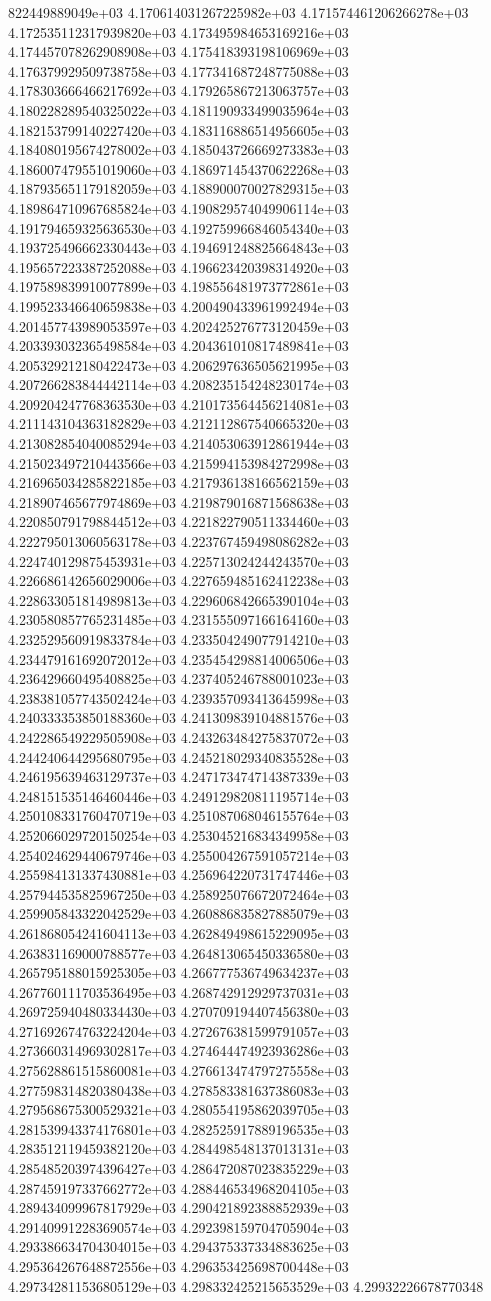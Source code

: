 822449889049e+03	4.170614031267225982e+03	4.171574461206266278e+03	4.172535112317939820e+03	4.173495984653169216e+03	4.174457078262908908e+03	4.175418393198106969e+03	4.176379929509738758e+03	4.177341687248775088e+03	4.178303666466217692e+03	4.179265867213063757e+03	4.180228289540325022e+03	4.181190933499035964e+03	4.182153799140227420e+03	4.183116886514956605e+03	4.184080195674278002e+03	4.185043726669273383e+03	4.186007479551019060e+03	4.186971454370622268e+03	4.187935651179182059e+03	4.188900070027829315e+03	4.189864710967685824e+03	4.190829574049906114e+03	4.191794659325636530e+03	4.192759966846054340e+03	4.193725496662330443e+03	4.194691248825664843e+03	4.195657223387252088e+03	4.196623420398314920e+03	4.197589839910077899e+03	4.198556481973772861e+03	4.199523346640659838e+03	4.200490433961992494e+03	4.201457743989053597e+03	4.202425276773120459e+03	4.203393032365498584e+03	4.204361010817489841e+03	4.205329212180422473e+03	4.206297636505621995e+03	4.207266283844442114e+03	4.208235154248230174e+03	4.209204247768363530e+03	4.210173564456214081e+03	4.211143104363182829e+03	4.212112867540665320e+03	4.213082854040085294e+03	4.214053063912861944e+03	4.215023497210443566e+03	4.215994153984272998e+03	4.216965034285822185e+03	4.217936138166562159e+03	4.218907465677974869e+03	4.219879016871568638e+03	4.220850791798844512e+03	4.221822790511334460e+03	4.222795013060563178e+03	4.223767459498086282e+03	4.224740129875453931e+03	4.225713024244243570e+03	4.226686142656029006e+03	4.227659485162412238e+03	4.228633051814989813e+03	4.229606842665390104e+03	4.230580857765231485e+03	4.231555097166164160e+03	4.232529560919833784e+03	4.233504249077914210e+03	4.234479161692072012e+03	4.235454298814006506e+03	4.236429660495408825e+03	4.237405246788001023e+03	4.238381057743502424e+03	4.239357093413645998e+03	4.240333353850188360e+03	4.241309839104881576e+03	4.242286549229505908e+03	4.243263484275837072e+03	4.244240644295680795e+03	4.245218029340835528e+03	4.246195639463129737e+03	4.247173474714387339e+03	4.248151535146460446e+03	4.249129820811195714e+03	4.250108331760470719e+03	4.251087068046155764e+03	4.252066029720150254e+03	4.253045216834349958e+03	4.254024629440679746e+03	4.255004267591057214e+03	4.255984131337430881e+03	4.256964220731747446e+03	4.257944535825967250e+03	4.258925076672072464e+03	4.259905843322042529e+03	4.260886835827885079e+03	4.261868054241604113e+03	4.262849498615229095e+03	4.263831169000788577e+03	4.264813065450336580e+03	4.265795188015925305e+03	4.266777536749634237e+03	4.267760111703536495e+03	4.268742912929737031e+03	4.269725940480334430e+03	4.270709194407456380e+03	4.271692674763224204e+03	4.272676381599791057e+03	4.273660314969302817e+03	4.274644474923936286e+03	4.275628861515860081e+03	4.276613474797275558e+03	4.277598314820380438e+03	4.278583381637386083e+03	4.279568675300529321e+03	4.280554195862039705e+03	4.281539943374176801e+03	4.282525917889196535e+03	4.283512119459382120e+03	4.284498548137013131e+03	4.285485203974396427e+03	4.286472087023835229e+03	4.287459197337662772e+03	4.288446534968204105e+03	4.289434099967817929e+03	4.290421892388852939e+03	4.291409912283690574e+03	4.292398159704705904e+03	4.293386634704304015e+03	4.294375337334883625e+03	4.295364267648872556e+03	4.296353425698700448e+03	4.297342811536805129e+03	4.298332425215653529e+03	4.29932226678770348